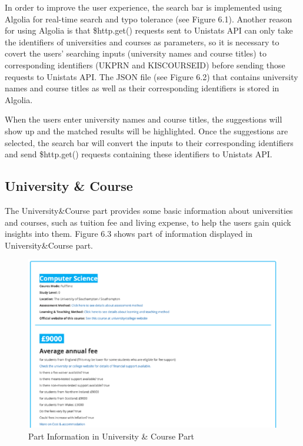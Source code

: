 In order to improve the user experience, the search bar is implemented using Algolia \cite{Alogolia} for real-time search and typo tolerance (see Figure 6.1). Another reason for using Algolia is that \$http.get() requests sent to Unistats API can only take the identifiers of universities and courses as parameters, so it is necessary to covert the users’ searching inputs (university names and course titles) to corresponding identifiers (UKPRN and KISCOURSEID) before sending those requests to Unistats API. The JSON file (see Figure 6.2) that contains university names and course titles as well as their corresponding identifiers is stored in Algolia. 








When the users enter university names and course titles, the suggestions will show up and the matched results will be highlighted. Once the suggestions are selected, the search bar will convert the inputs to their corresponding identifiers and send \$http.get() requests containing these identifiers to Unistats API. 

\subsection{University \& Course}

The University\&Course part provides some basic information about universities and courses, such as tuition fee and living expense, to help the users gain quick insights into them. Figure 6.3 shows part of information displayed in University\&Course part. 

\begin{figure}[H]
  \centering
  \includegraphics[width=15cm]{./img/Picture18}
  \caption{Part Information in University \& Course Part}
  \label{Figure:figex}
\end{figure}


